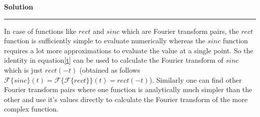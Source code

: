 \documentclass[a4paper]{article}
\newenvironment{solution}[2][]{%
    \begin{mdframed}[linecolor=green!60!black, linewidth=2pt, roundcorner=10pt, backgroundcolor=green!5!white, skipabove=12pt, skipbelow=12pt]%
        \textbf{\large #2} %
        \par\noindent\rule{\textwidth}{0.4pt} %
        \vspace{0.5em} %
}{%
    \end{mdframed}%
}
\begin{document}
\begin{solution}{Solution}
    In case of functions like $rect$ and $sinc$ which are Fourier transform pairs, the $rect$ function is sufficiently simple
    to evaluate numerically whereas the $sinc$ function requires a lot more approximations to evaluate the value at a single
    point. So the identity in equation\ref{t} can be used to calculate the Fourier transform of $sinc$ which is 
    just $rect(-t)$ (obtained as follows $\mathcal{F}\{sinc\}(t) = \mathcal{F}\{\mathcal{F}\{rect\}\}(t) = rect(-t)$). Similarly
    one can find other Fourier transform pairs where one function is analytically much simpler than the other and use it's
    values directly to calculate the Fourier transform of the more complex function.
     
\end{solution}
\end{document}
